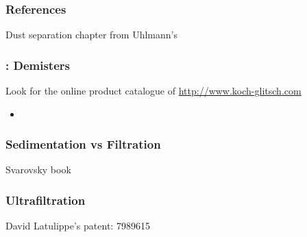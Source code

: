 
\begin{frame}\frametitle{References}
	Dust separation chapter from Uhlmann's 
\end{frame}

\begin{frame}\frametitle{{\color{myGreen}{Quick}}: Demisters}
	Look for the online product catalogue of \href{http://www.koch-glitsch.com}{http://www.koch-glitsch.com}
	
	\begin{itemize}
		\item	
	\end{itemize}
\end{frame}

\begin{frame}\frametitle{Sedimentation vs Filtration}
	Svarovsky book
\end{frame}

\begin{frame}\frametitle{Ultrafiltration}
	David Latulippe's patent: 7989615
	
\end{frame}